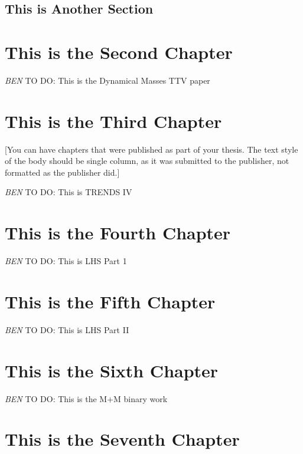 \documentclass[12pt]{caltech_thesis}
\newcommand{\todo}[3]{{\color{#2} \emph{#1} TO DO: #3}}
\newcommand{\btmtodo}[1]{\todo{BEN}{red}{#1}}
\begin{document}
\section{This is Another Section}
\lipsum[6-7] 

\chapter{This is the Second Chapter}

\btmtodo{This is the Dynamical Masses TTV paper}


\chapter{This is the Third Chapter}


[You can have chapters that were published as part of your thesis. The text style of the body should be single column, as it was submitted to the publisher, not formatted as the publisher did.]

\btmtodo{This is TRENDS IV}

\chapter{This is the Fourth Chapter}

\btmtodo{This is LHS Part 1}
\chapter{This is the Fifth Chapter}

\btmtodo{This is LHS Part II}

\chapter{This is the Sixth Chapter}

\btmtodo{This is the M+M binary work}

\chapter{This is the Seventh Chapter}
\end{document}
